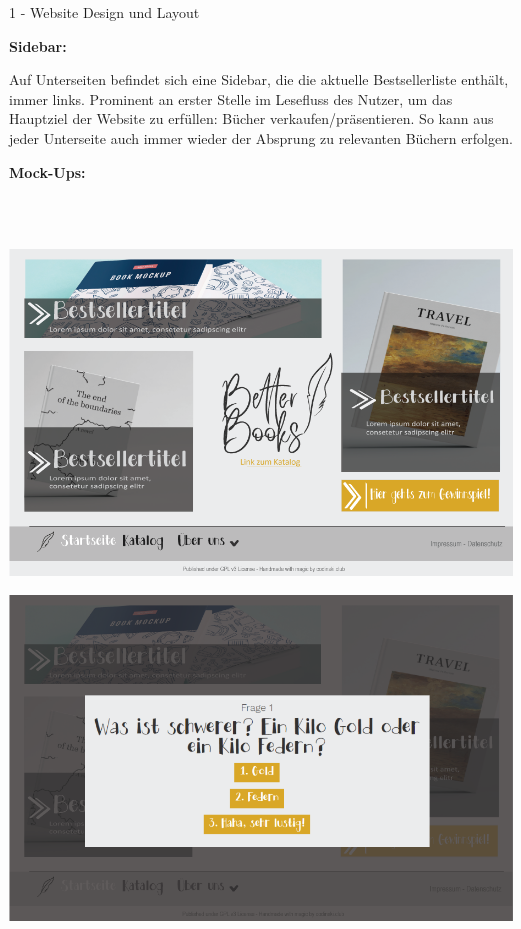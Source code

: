 \documentclass[a4paper]{article}
\begin{document}
\begin{exercise}{1 - Website Design und Layout}
\begin{Large}
\textbf{Sidebar:}
\end{Large}
Auf Unterseiten befindet sich eine Sidebar, die die aktuelle Bestsellerliste enthält, immer links. Prominent an erster Stelle im Lesefluss des Nutzer, um das Hauptziel der Website zu erfüllen: Bücher verkaufen/präsentieren. 
So kann aus jeder Unterseite auch immer wieder der Absprung zu relevanten Büchern erfolgen.\newpage
\begin{Large}
\textbf{Mock-Ups:}
\end{Large}\\\\
\begin{center}
 \includegraphics[scale=0.5]{../1_bookstore_main.png}
 \end{center}
 \begin{center}
 \includegraphics[scale=0.5]{../5_bookstore_quiz.png}
 \end{center}

\end{exercise}
\end{document}
